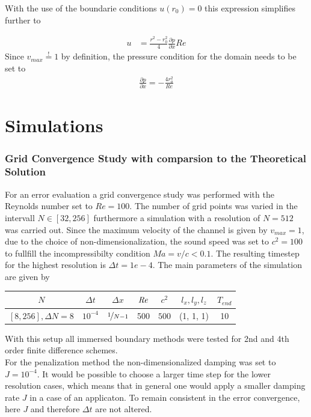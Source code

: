 \clearpage
With the use of the boundarie conditions $u(r_0) = 0$ this expression simplifies further to

\begin{align}
    u &= \frac{r^2 - r_0^2}{4}\frac{\partial p}{\partial x}Re
\end{align}
Since $v_{max} \stackrel{!}{=} 1$ by definition, the pressure condition for the domain needs to be set to
\begin{align}
    \frac{\partial p}{\partial x} = -\frac{4 r_o^2}{Re}
\end{align}

\section{Simulations}

\subsubsection{Grid Convergence Study with comparsion to the Theoretical Solution}

For an error evaluation a grid convergence study was performed with the Reynolds number set to $Re=100$.
The number of grid points was varied in the intervall $N\in[32, 256]$ furthermore a
simulation with a resolution of $N=512$ was carried out.
Since the maximum velocity of the channel is given by $v_{max}=1$, due to the choice of non-dimensionalization,
the sound speed was set to $c^2 = 100$ to fullfill the incompressibilty condition $Ma = v/c < 0.1$.
The resulting timestep for the highest resolution is $\Delta t = 1e-4$.
The main parameters of the simulation are  given by

\begin{center}
\vspace*{0.7ex}
\begin{tabular}{c|c|c|c|c|c|c }
 $ N  $                   & $\Delta t$ & $\Delta x$            & $\mbox{\textit{Re}}$  & $c^2$   & $l_x, l_y, l_z$ & $T_{end}$\\
\hline
 $[8, 256], \Delta N = 8 $& $10^{-4}$ & $\nicefrac{1}{N - 1}$ & 500     & $500$   & (1, 1, 1)       & 10\\
\end{tabular}
\vspace*{0.7ex}
\end{center}

With this setup all immersed boundary methods were tested for 2nd and 4th order finite difference schemes.\\
For the penalization method the non-dimensionalized damping was set to $J=10^{-4}$.
It would be possible to choose a larger time step for the lower resolution cases, which means that in general
one would apply a smaller damping rate $J$ in a case of an applicaton. To remain consistent in the error convergence, here $J$ and
therefore $\Delta t$ are not altered.

